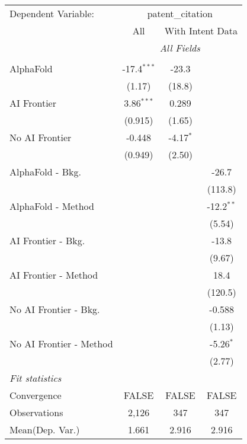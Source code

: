 \begingroup
\centering
\begin{tabular}{lccc}
   \tabularnewline \midrule \midrule
   Dependent Variable: & \multicolumn{3}{c}{patent\_citation}\\
 & \multicolumn{1}{c}{All} & \multicolumn{2}{c}{With Intent Data} \\
\cmidrule(lr){2-2} \cmidrule(lr){3-4}
 & \multicolumn{3}{c}{\textit{All Fields}} \\ \\
   AlphaFold               & -17.4$^{***}$ & -23.3       &   \\   
                           & (1.17)        & (18.8)      &   \\   
   AI Frontier             & 3.86$^{***}$  & 0.289       &   \\   
                           & (0.915)       & (1.65)      &   \\   
   No AI Frontier          & -0.448        & -4.17$^{*}$ &   \\   
                           & (0.949)       & (2.50)      &   \\   
   AlphaFold - Bkg.        &               &             & -26.7\\   
                           &               &             & (113.8)\\   
   AlphaFold - Method      &               &             & -12.2$^{**}$\\   
                           &               &             & (5.54)\\   
   AI Frontier - Bkg.      &               &             & -13.8\\   
                           &               &             & (9.67)\\   
   AI Frontier - Method    &               &             & 18.4\\   
                           &               &             & (120.5)\\   
   No AI Frontier - Bkg.   &               &             & -0.588\\   
                           &               &             & (1.13)\\   
   No AI Frontier - Method &               &             & -5.26$^{*}$\\   
                           &               &             & (2.77)\\   
   \midrule
   \emph{Fit statistics}\\
   Convergence             &FALSE          & FALSE       & FALSE\\  
   Observations            & 2,126         & 347         & 347\\  
Mean(Dep. Var.) & 1.661 & 2.916 & 2.916 \\
   

\end{tabular}
